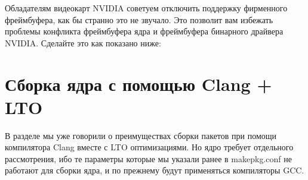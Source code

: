 \documentclass[letterpaper,10pt,russian,openany]{sphinxmanual}
\begin{document}
\sphinxAtStartPar
{}

\noindent{}

\sphinxAtStartPar
{}

\noindent{}

\sphinxAtStartPar
{} Обладателям видеокарт NVIDIA советуем отключить поддержку фирменного фреймбуфера, как бы странно это не звучало.
Это позволит вам избежать проблемы конфликта фреймбуфера ядра и фреймбуфера бинарного драйвера NVIDIA. Сделайте это
как показано ниже:

\sphinxAtStartPar
{}

\noindent{}

\sphinxAtStartPar
{}

\noindent{}

\sphinxAtStartPar
{}

\noindent{}

\sphinxAtStartPar
{}

\noindent{}

\sphinxAtStartPar
{}

\noindent{}

\ignorespaces 

\section{Сборка ядра с помощью Clang + LTO}
\label{\detokenize{source/custom-kernels:clang-lto}}\label{\detokenize{source/custom-kernels:kernel-with-clang-lto}}\label{\detokenize{source/custom-kernels:index-6}}
\sphinxAtStartPar
В разделе 
мы уже говорили о преимуществах сборки пакетов при помощи компилятора Clang вместе с LTO оптимизациями.
Но ядро требует отдельного рассмотрения, ибо те параметры которые мы указали ранее в makepkg.conf не работают для сборки ядра,
и по прежнему будут применяться компиляторы GCC.
\end{document}
